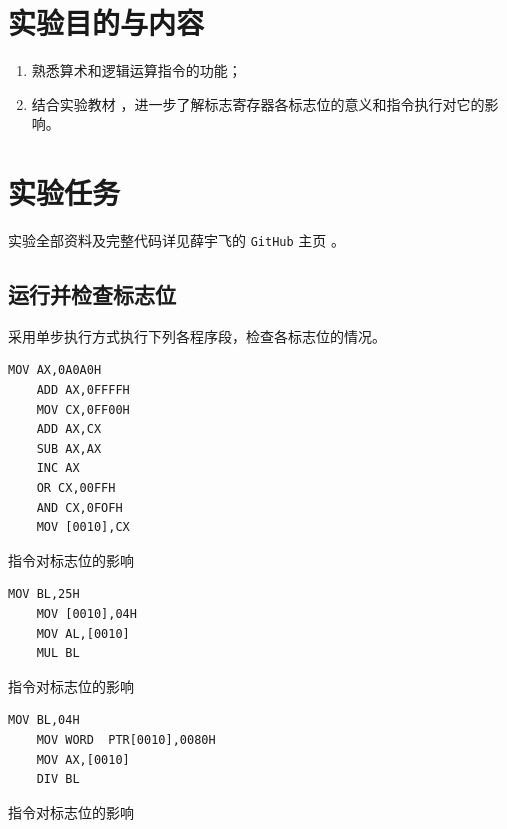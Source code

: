 \documentclass[11pt]{SEU-Digital-Report}
\begin{document}
\exptitlepage

\tableofcontents
\newpage

\section{实验目的与内容}       
\begin{enumerate}
    \item 熟悉算术和逻辑运算指令的功能；
    \item 结合实验教材 \cite{book,guide}，进一步了解标志寄存器各标志位的意义和指令执行对它的影响。   
\end{enumerate}

\section{实验任务}
实验全部资料及完整代码详见薛宇飞的 \texttt{GitHub} 主页 \cite{mygit}。

\subsection{运行并检查标志位}
采用单步执行方式执行下列各程序段，检查各标志位的情况。
\begin{lstlisting}[language={[x86masm]Assembler},title=code1]
    MOV AX,0A0A0H
    ADD AX,0FFFFH
    MOV CX,0FF00H  
    ADD AX,CX
    SUB AX,AX
    INC AX
    OR CX,00FFH
    AND CX,0FOFH
    MOV [0010],CX
\end{lstlisting}

\begin{analyze}{指令对标志位的影响}{}

\end{analyze}

\begin{lstlisting}[language={[x86masm]Assembler},title=code2]
    MOV BL,25H
    MOV [0010],04H
    MOV AL,[0010]
    MUL BL
\end{lstlisting}

\begin{analyze}{指令对标志位的影响}{}

\end{analyze}

\begin{lstlisting}[language={[x86masm]Assembler},title=code3]
    MOV BL,04H
    MOV WORD  PTR[0010],0080H
    MOV AX,[0010]
    DIV BL
\end{lstlisting}

\begin{analyze}{指令对标志位的影响}{}

\end{analyze}
\end{document}
